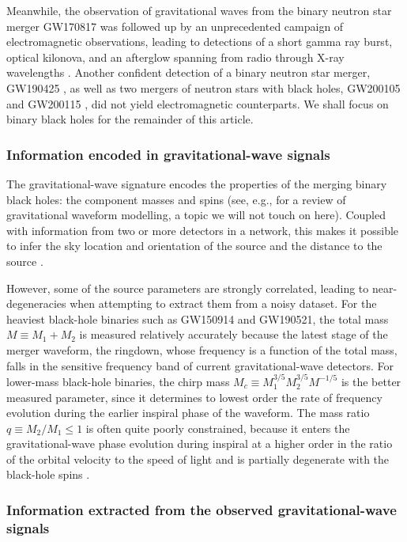 \documentclass[review]{elsarticle}
\begin{document}
Meanwhile, the observation of gravitational waves from the binary neutron star merger GW170817 \citep{GW170817} was followed up by an unprecedented campaign of electromagnetic observations, leading to detections of a short gamma ray burst, optical kilonova, and an afterglow spanning from radio through X-ray wavelengths \citep{GW170817:GRB,GW170817:MMA}.  Another confident detection of a binary neutron star merger, GW190425 \citep{GW190425}, as well as two mergers of neutron stars with black holes,  GW200105 and GW200115 \citep{GW200105}, did not yield electromagnetic counterparts.  
We shall focus on binary black holes for the remainder of this article.

\subsubsection{Information encoded in gravitational-wave signals}
The gravitational-wave signature encodes the properties of the merging binary black holes: the component masses and spins (see, e.g., \cite{Schmidt:2020} for a review of gravitational waveform modelling, a topic we will not touch on here). Coupled with information from two or more detectors in a network, this makes it possible to infer the sky location and orientation of the source and the distance to the source \citep{Veitch:2014,GW150914:PE, Ashton:2019}.  

However, some of the source parameters are strongly correlated, leading to near-degeneracies when attempting to extract them from a noisy dataset.   For the heaviest black-hole binaries such as GW150914 and GW190521, the total mass $M \equiv M_1 + M_2$ is measured relatively accurately because the latest stage of the merger waveform, the ringdown, whose frequency is a function of the total mass, falls in the sensitive frequency band of current gravitational-wave detectors.  For lower-mass black-hole binaries, the chirp mass $M_c \equiv M_1^{3/5} M_2^{3/5} M^{-1/5}$ is the better measured parameter, since it determines to lowest order the rate of frequency evolution during the earlier inspiral phase of the waveform.  The mass ratio $q\equiv M_2/M_1 \leq 1$ is often quite poorly constrained, because it enters the gravitational-wave phase evolution during inspiral at a higher order in the ratio of the orbital velocity to the speed of light and is partially degenerate with the black-hole spins \citep[e.g.,][]{PoissonWill:1995,Hannam:2013}.  

\subsubsection{Information extracted from the observed gravitational-wave signals}\label{sec:GWevents}
\end{document}
